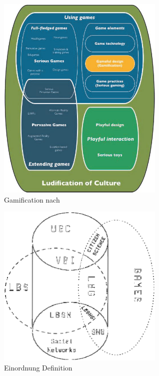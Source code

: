 \begin{figure}[H]
\begin{center}
\includegraphics[width=80mm]{images/ch3_img02_gamification.png}
\caption{Gamification nach \cite{Deterding.2011}}
\label{img:ch3_img02_gamification}
\end{center}
\end{figure}

\begin{figure}[H]
\begin{center}
\includegraphics[width=80mm]{images/ch3_img01_LBG_SN_etc.png}
\caption{Einordnung Definition}
\label{img:ch3_img01_LBG_SN_etc}
\end{center}
\end{figure}

